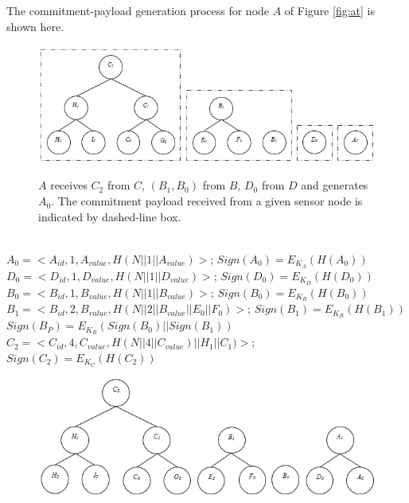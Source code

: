 			\begin{exmp} The commitment-payload generation process for node $A$ of Figure \ref{fig:at} is shown here.\\
				\begin{figure}[hp]
					\centering
					\includegraphics[scale = 1]{images/commitment-tree-example-1.png}\\
					\caption{$A$ receives $C_{2}$ from $C$, $(B_{1},B_{0})$ from $B$, $D_{0}$ from $D$ and generates $A_{0}$. The commitment payload received from a given sensor node is indicated by dashed-line box.}
					\label{fig:commitment-tree-example-1}
				\end{figure}\\
				$A_{0} = <A_{id}, 1, A_{value}, H(N||1||A_{value})>$; $Sign(A_{0}) = E_{K_{A}}(H(A_{0}))$ \\
				$D_{0} = <D_{id}, 1, D_{value}, H(N||1||D_{value})>$; $Sign(D_{0}) = E_{K_{D}}(H(D_{0}))$\\
				$B_{0} = <B_{id}, 1, B_{value}, H(N||1||B_{value})>$; $Sign(B_{0}) = E_{K_{B}}(H(B_{0}))$\\
				$B_{1} = <B_{id}, 2, B_{value}, H(N||2||B_{value}||E_{0}||F_{0})>$; $Sign(B_{1}) = E_{K_{B}}(H(B_{1}))$\\
				$Sign(B_{P}) = E_{K_{B}}(Sign(B_{0}) || Sign(B_{1}))$\\
				$C_{2} = <C_{id}, 4, C_{value}, H(N||4||C_{value})||H_{1}||C_{1})>$; $Sign(C_{2}) = E_{K_{C}}(H(C_{2}))$\\
				\begin{figure}[hp]
					\centering
					\includegraphics[scale = 1]{images/commitment-tree-example-2.png}\\

\end{figure}
\end{exmp}
